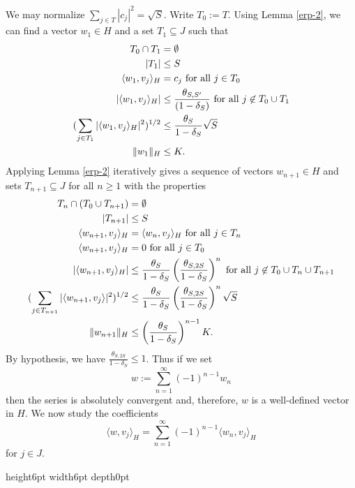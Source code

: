 \documentclass[11pt]{article}
\newenvironment{proof}{\noindent {\bf Proof} }{\endprf\par}
\def \endprf{\hfill {\vrule height6pt width6pt depth0pt}\medskip}
\newcommand{\<}{\langle}
\renewcommand{\>}{\rangle}
\numberwithin{equation}{section}
\begin{document}
\begin{proof}  
  We may normalize $\sum_{j \in T} |c_j|^2 = \sqrt{S}$.  Write $T_0 :=
  T$.  Using Lemma \ref{erp-2}, we can find a vector $w_1 \in H$ and a
  set $T_1 \subseteq J$ such that
\begin{align*}
  T_0 \cap T_1 &= \emptyset\\
  |T_1| &\leq S \\
  \langle w_1, v_j \rangle_H &= c_j \hbox{ for all } j \in T_0\\
  |\langle w_1, v_j \rangle_H| &\leq \frac{\theta_{S,S'}}{(1-\delta_S)} 
\hbox{ for all } j \not \in T_0 \cup T_1 \\
  (\sum_{j \in T_1} |\langle w_1, v_j \rangle_H|^2)^{1/2} 
&\leq \frac{\theta_S}{1 - \delta_{S}} \sqrt{S}\\
  \|w_1\|_H &\leq K.
\end{align*}
Applying Lemma \ref{erp-2} iteratively gives a sequence of vectors
$w_{n+1} \in H$ and sets $T_{n+1} \subseteq J$ for all $n \geq 1$ with
the properties 
\begin{align*}
  T_n \cap (T_0 \cup T_{n+1}) &= \emptyset\\
  |T_{n+1}| &\leq S \\
  \langle w_{n+1}, v_j \rangle_H &= \langle w_n, v_j \rangle_H
  \hbox{ for all } j \in T_n\\
  \langle w_{n+1}, v_j \rangle_H &= 0 \hbox{ for all } j \in T_0\\
  |\langle w_{n+1}, v_j \rangle_H| &\leq \frac{\theta_S}{1 -
    \delta_{S}} \left(\frac{\theta_{S,2S}}{1-\delta_S}\right)^{n}
  \hbox{ for all } j \not \in T_0 \cup T_n \cup T_{n+1} \\
  (\sum_{j \in T_{n+1}} |\langle w_{n+1}, v_j \rangle|^2)^{1/2} &\leq
  \frac{\theta_S}{1 - \delta_{S}}
  \left(\frac{\theta_{S,2S}}{1 - \delta_{S}}\right)^{n} \sqrt{S}\\
  \| w_{n+1} \|_H &\leq \left(\frac{\theta_S}{1 -
      \delta_{S}}\right)^{n-1} K.
\end{align*}
By hypothesis, we have $\frac{\theta_{S,2S}}{1-\delta_S} \leq 1$.
Thus if we set
\[
w := \sum_{n=1}^\infty (-1)^{n-1} w_n
\]
then the series is absolutely convergent and, therefore, $w$ is a
well-defined vector in $H$.  We now study the coefficients
\begin{equation}\label{w-converge}
\langle w, v_j \rangle_H = 
\sum_{n=1}^\infty (-1)^{n-1} \langle w_n, v_j\rangle_H
\end{equation}
for $j \in J$.


\end{proof}
\end{document}
